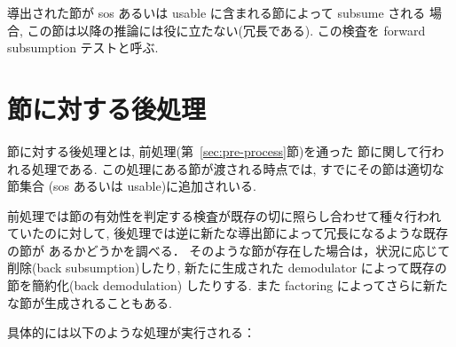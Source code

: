 導出された節が sos あるいは usable に含まれる節によって subsume される
場合, この節は以降の推論には役に立たない(冗長である). 
この検査を forward subsumption テストと呼ぶ.

\section{節に対する後処理}
\label{sec:post-process}
節に対する後処理とは, 前処理(第~\ref{sec:pre-process}節)を通った
節に関して行われる処理である. 
この処理にある節が渡される時点では, すでにその節は適切な節集合
(sos あるいは usable)に追加されいる.

前処理では節の有効性を判定する検査が既存の切に照らし合わせて種々行われ
ていたのに対して,
後処理では逆に新たな導出節によって冗長になるような既存の節が
あるかどうかを調べる．
そのような節が存在した場合は，状況に応じて削除(back subsumption)したり,
新たに生成された demodulator によって既存の節を簡約化(back demodulation)
したりする. また factoring によってさらに新たな節が生成されることもある.

具体的には以下のような処理が実行される：

